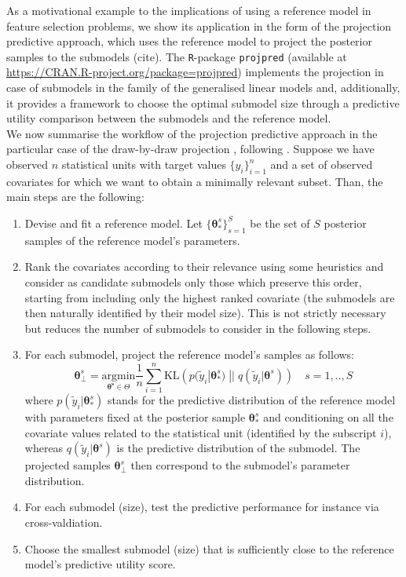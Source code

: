 \documentclass[american,]{article}
\theoremstyle{definition}
\begin{document}
As a motivational example to the implications of using a reference model in feature selection problems, we show its application in the form of the projection predictive approach, which uses the reference model to project the posterior samples to the submodels (cite). The \texttt{R}-package \texttt{projpred} (available at \url{https://CRAN.R-project.org/package=projpred}) implements the projection in case of submodels in the family of the generalised linear models and, additionally, it provides a framework to choose the optimal submodel size through a predictive utility comparison between the submodels and the reference model. 
\\
We now summarise the workflow of the projection predictive approach in the particular case of the draw-by-draw projection \cite[original formulation by][]{paper:original_proj}, following \cite{paper:projpred}. Suppose we have observed $n$ statistical units with target values $\{y_{i}\}_{i=1}^{n}$ and a set of observed covariates for which we want to obtain a minimally relevant subset. Than, the main steps are the following:
\begin{enumerate}
\item Devise and fit a reference model. Let $\{\boldsymbol{\theta}_{*}^{s}\}_{s=1}^{S}$ be the set of $S$ posterior samples of the reference model's parameters.
\item Rank the covariates according to their relevance using some heuristics and consider as candidate submodels only those which preserve this order,  starting from including only the highest ranked covariate (the submodels are then naturally identified by their model size). This is not strictly necessary but reduces the number of submodels to consider in the following steps.
\item For each submodel, project the reference model's samples as follows:
\begin{equation}\label{eq:draw_by_draw}
\boldsymbol{\theta}_{\perp}^{s} = \underset{\boldsymbol{\theta^{s}}\in\Theta}{\text{argmin}} \frac{1}{n}\sum_{i=1}^{n}\text{KL} \left( p(\tilde{y}_{i}|\boldsymbol{\theta}_{*}^{s})\;||\;q(\tilde{y}_{i}|\boldsymbol{\theta}^{s}) \right) \quad s=1,..,S
\end{equation}
where $p(\tilde{y}_{i}|\boldsymbol{\theta}_{*}^{s})$ stands for the predictive distribution of the reference model with parameters fixed at the posterior sample $\boldsymbol{\theta}_{*}^{s}$ and conditioning on all the covariate values related to the statistical unit (identified by the subscript $i$), whereas $q(\tilde{y}_{i}|\boldsymbol{\theta}^{s})$ is the predictive distribution of the submodel. The projected samples $\boldsymbol{\theta}_{\perp}^{s}$ then correspond to the submodel's parameter distribution.
\item For each submodel (size), test the predictive performance for instance via cross-valdiation.
\item Choose the smallest submodel (size) that is sufficiently close to the reference model's predictive utility score.
\end{enumerate} 
\end{document}
